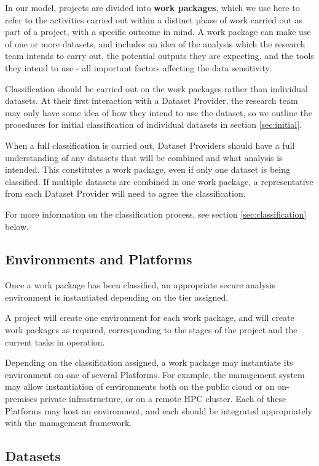 \documentclass[10pt,a4paper,twocolumn]{article}
\begin{document}
In our model, projects are divided into \textbf{work packages}, which we use here to refer to the activities carried out  within a distinct phase of work carried out as part of a project, with a specific outcome in mind. A work package can make use of one or more datasets, and includes an idea of the analysis which the research team intends to carry out, the potential outputs they are expecting, and the tools they intend to use - all important factors affecting the data sensitivity.

Classification should be carried out on the work packages rather than individual datasets. At their first interaction with a Dataset Provider, the research team may only have some idea of how they intend to use the dataset, so we outline the procedures for initial classification of individual datasets in section \ref{sec:initial}.

When a full classification is carried out, Dataset Providers should have a full understanding of any datasets that will be combined and what analysis is intended. This constitutes a work package, even if only one dataset is being classified. If multiple datasets are combined in one work package, a representative from each Dataset Provider will need to agree the classification.

For more information on the classification process, see section \ref{sec:classification} below.

\subsection{Environments and Platforms}

Once a work package has been classified, an appropriate secure analysis environment is instantiated depending on the tier assigned. 

A project will create one environment for each work package, and will create work packages as required, corresponding to the stages of the project and the current tasks in operation.

Depending on the classification assigned, a work package may instantiate its environment on one of several Platforms. For example, the management system may allow instantiation of environments both on the public cloud or an on-premises private infrastructure, or on a remote HPC cluster. Each of these Platforms may host an environment, and each should be integrated appropriately with the management framework.

\subsection{Datasets}
\end{document}
